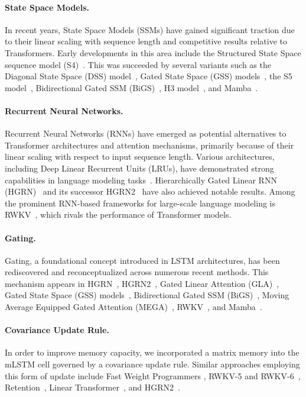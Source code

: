 \paragraph{State Space Models.} In recent years, State Space Models (SSMs) have gained significant traction due to their linear scaling with sequence length and competitive results relative to Transformers. Early developments in this area include the Structured State Space sequence model (S4)~\citep{Gu:21}. This was succeeded by several variants such as the Diagonal State Space (DSS) model~\citep{Gupta:22}, Gated State Space (GSS) models~\citep{Mehta:22}, the S5 model~\citep{Smith:22}, Bidirectional Gated SSM (BiGS)~\citep{Wang:22}, H3 model~\citep{Fu:23}, and Mamba~\citep{Gu:24arxiv}.

\paragraph{Recurrent Neural Networks.} Recurrent Neural Networks (RNNs) have emerged as potential alternatives to Transformer architectures and attention mechanisms, primarily because of their linear scaling with respect to input sequence length. Various architectures, including Deep Linear Recurrent Units (LRUs), have demonstrated strong capabilities in language modeling tasks~\citep{Orvieto:23, De:24arxiv}. Hierarchically Gated Linear RNN (HGRN)~\citep{Qin:23} and its successor HGRN2~\citep{Qin:24arxiv} have also achieved notable results. Among the prominent RNN-based frameworks for large-scale language modeling is RWKV~\citep{Peng:23arxivshort,Peng:24arxivshort}, which rivals the performance of Transformer models.

\paragraph{Gating.}
Gating, a foundational concept introduced in LSTM architectures, has been rediscovered and reconceptualized across numerous recent methods. This mechanism appears in HGRN~\citep{Qin:23}, HGRN2~\citep{Qin:24arxiv}, Gated Linear Attention (GLA)~\citep{Yang:23arxiv}, Gated State Space (GSS) models~\citep{Mehta:22}, Bidirectional Gated SSM (BiGS)~\citep{Wang:22}, Moving Average Equipped Gated Attention (MEGA)~\citep{Ma:22}, RWKV~\citep{Peng:23arxivshort}, and Mamba~\citep{Gu:24arxiv}.

\paragraph{Covariance Update Rule.} In order to improve memory capacity, we incorporated a matrix memory into the mLSTM cell governed by a covariance update rule. Similar approaches employing this form of update include Fast Weight Programmers \citep{Schmidhuber:92ncfastweights,Schlag:21}, RWKV-5 and RWKV-6~\citep{Peng:24arxivshort}, Retention~\citep{Sun:23arxiv}, Linear Transformer~\citep{Katharopoulos:20}, and HGRN2~\citep{Qin:24arxiv}.


